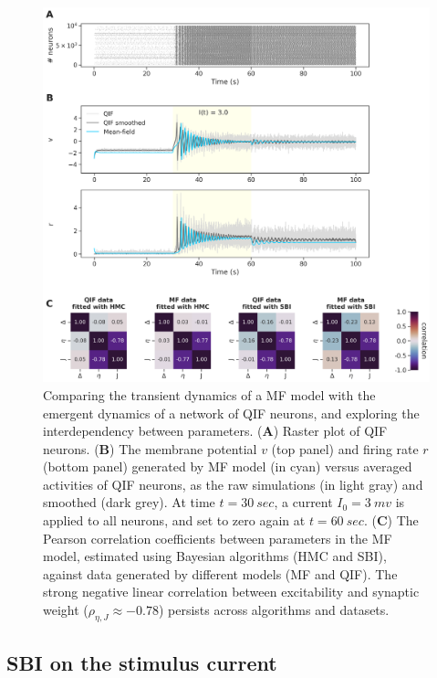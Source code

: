 \documentclass[preprint,11pt,authoryear]{elsarticle}
\begin{document}
\begin{figure}
     \centering
     \includegraphics[width=\linewidth]{Figs/Fig6.png}
     \caption{Comparing the transient dynamics of a MF model with the emergent dynamics of a network of QIF neurons, and exploring the interdependency between parameters. (\textbf{A}) Raster plot of QIF neurons. (\textbf{B}) The membrane potential $v$ (top panel) and firing rate $r$ (bottom panel) generated by MF model (in cyan) versus averaged activities of QIF neurons, as the raw simulations (in light gray) and smoothed (dark grey). At time $t=30~sec$, a current $I_0=3~ mv$ is applied to all neurons, and set to zero again at $t=60~sec$. (\textbf{C}) The Pearson correlation coefficients between parameters in the MF model, estimated using Bayesian algorithms (HMC and SBI), against data generated by different models (MF and QIF). The strong negative linear correlation between excitability and synaptic weight ($\rho_{\eta, J} \approx -0.78$) persists across algorithms and datasets.}
     \label{fig:QIF_correlations}
 \end{figure}



 
\subsection{SBI on the stimulus current}
\end{document}
